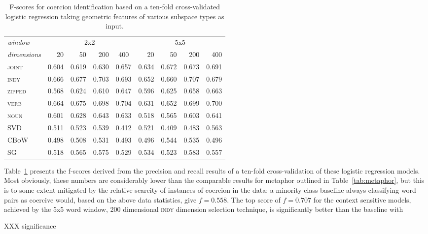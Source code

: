 \begin{table}
\centering
\begin{tabular}{lrrrr|rrrr}
\hline
\emph{window} & \multicolumn{4}{c}{2x2} & \multicolumn{4}{c}{5x5} \\
\emph{dimensions} & 20 & 50 & 200 & \multicolumn{1}{c}{400} & 20 & 50 & 200 & 400 \\
\hline
\textsc{joint} & 0.604 & 0.619 & 0.630 & 0.657 & 0.634 & 0.672 & 0.673 & 0.691 \\
\textsc{indy} & 0.666 & 0.677 & 0.703 & 0.693 & 0.652 & 0.660 & 0.707 & 0.679 \\
\textsc{zipped} & 0.568 & 0.624 & 0.610 & 0.647 & 0.596 & 0.625 & 0.658 & 0.663 \\
\textsc{verb} & 0.664 & 0.675 & 0.698 & 0.704 & 0.631 & 0.652 & 0.699 & 0.700 \\
\textsc{noun} & 0.601 & 0.628 & 0.643 & 0.633 & 0.518 & 0.565 & 0.603 & 0.641 \\
\textsc{SVD} & 0.511 & 0.523 & 0.539 & 0.412 & 0.521 & 0.409 & 0.483 & 0.563 \\
\textsc{CBoW} & 0.498 & 0.508 & 0.531 & 0.493 & 0.496 & 0.544 & 0.535 & 0.496 \\
\textsc{SG} & 0.518 & 0.565 & 0.575 & 0.529 & 0.534 & 0.523 & 0.583 & 0.557 \\
\hline
\end{tabular}
\caption[Context Sensitive and Static Model F-Scores for Coercion Classification]{F-scores for coercion identification based on a ten-fold cross-validated logistic regression taking geometric features of various subspace types as input.}
\label{tab:coercion}
\end{table}

Table~\ref{tab:coercion} presents the f-scores derived from the precision and recall results of a ten-fold cross-validation of these logistic regression models.  Most obviously, these numbers are considerably lower than the comparable results for metaphor outlined in Table~\ref{tab:metaphor}, but this is to some extent mitigated by the relative scarcity of instances of coercion in the data: a minority class baseline always classifying word pairs as coercive would, based on the above data statistics, give $f = 0.558$.  The top score of $f = 0.707$ for the context sensitive models, achieved by the 5x5 word window, 200 dimensional \textsc{indy} dimension selection technique, is significantly better than the baseline with

XXX significance

